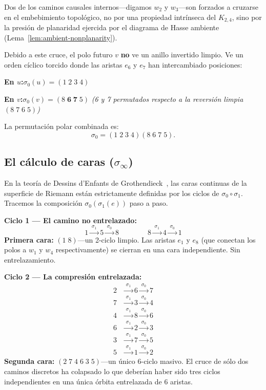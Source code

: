 \documentclass[11pt, a4paper, openany]{book}
\begin{document}
Dos de los caminos causales internos---digamos $w_2$ y $w_3$---son
forzados a cruzarse en el embebimiento topol\'ogico, no por una
propiedad intr\'inseca del $K_{2,4}$, sino por la presi\'on de
planaridad ejercida por el diagrama de Hasse ambiente
(Lema~\ref{lem:ambient-nonplanarity}).

Debido a este cruce, el polo futuro $v$ \textbf{no} ve un anillo
invertido limpio. Ve un orden cíclico torcido donde las aristas
$e_6$ y $e_7$ han intercambiado posiciones:

\medskip
\noindent
\textbf{En $u$:}\quad $\sigma_0(u) = (1\;2\;3\;4)$

\noindent
\textbf{En $v$:}\quad $\sigma_0(v) = (8\;\mathbf{6\;7}\;5)$
\quad\textit{(6 y 7 permutados respecto a la reversión limpia
$(8\;7\;6\;5)$)}

\medskip
\noindent
La permutación polar combinada es:
\[
  \sigma_0 = (1\;2\;3\;4)(8\;6\;7\;5).
\]

\subsection{El cálculo de caras ($\sigma_\infty$)}

En la teoría de Dessins d'Enfants de
Grothendieck~\cite{grothendieck1984}, las caras continuas de la
superficie de Riemann están estrictamente definidas por los ciclos de
$\sigma_0 \circ \sigma_1$. Tracemos la composición
$\sigma_0(\sigma_1(e))$ paso a paso.

\medskip
\noindent
\textbf{Ciclo 1 --- El camino no entrelazado:}
\[
  1 \xrightarrow{\;\sigma_1\;} 5 \xrightarrow{\;\sigma_0\;} 8
  \qquad\qquad
  8 \xrightarrow{\;\sigma_1\;} 4 \xrightarrow{\;\sigma_0\;} 1
\]
\textbf{Primera cara:} $(1\;8)$---un 2-ciclo limpio. Las aristas $e_1$
y $e_8$ (que conectan los polos a $w_1$ y $w_4$ respectivamente) se
cierran en una cara independiente. Sin entrelazamiento.

\medskip
\noindent
\textbf{Ciclo 2 --- La compresión entrelazada:}
\begin{align*}
  2 &\xrightarrow{\;\sigma_1\;} 6 \xrightarrow{\;\sigma_0\;} 7 \\
  7 &\xrightarrow{\;\sigma_1\;} 3 \xrightarrow{\;\sigma_0\;} 4 \\
  4 &\xrightarrow{\;\sigma_1\;} 8 \xrightarrow{\;\sigma_0\;} 6 \\
  6 &\xrightarrow{\;\sigma_1\;} 2 \xrightarrow{\;\sigma_0\;} 3 \\
  3 &\xrightarrow{\;\sigma_1\;} 7 \xrightarrow{\;\sigma_0\;} 5 \\
  5 &\xrightarrow{\;\sigma_1\;} 1 \xrightarrow{\;\sigma_0\;} 2
\end{align*}
\textbf{Segunda cara:} $(2\;7\;4\;6\;3\;5)$---un único 6-ciclo
masivo. El cruce de sólo dos caminos discretos ha colapsado lo que
deberían haber sido tres ciclos independientes en una única órbita
entrelazada de 6 aristas.
\end{document}
